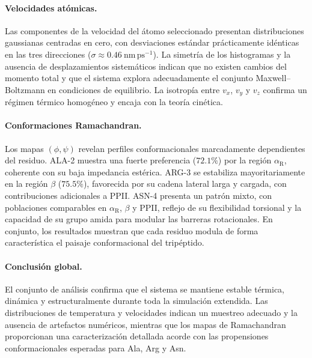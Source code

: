 \documentclass[12pt,a4paper]{article}
\begin{document}
\paragraph{Velocidades atómicas.}
Las componentes de la velocidad del átomo seleccionado presentan distribuciones gaussianas centradas en cero, con desviaciones estándar prácticamente idénticas en las tres direcciones (\(\sigma \approx 0.46~\mathrm{nm\,ps^{-1}}\)). La simetría de los histogramas y la ausencia de desplazamientos sistemáticos indican que no existen cambios del momento total y que el sistema explora adecuadamente el conjunto Maxwell--Boltzmann en condiciones de equilibrio. La isotropía entre \(v_x\), \(v_y\) y \(v_z\) confirma un régimen térmico homogéneo y encaja con la teoría cinética.

\paragraph{Conformaciones Ramachandran.}
Los mapas \((\phi,\psi)\) revelan perfiles conformacionales marcadamente dependientes del residuo. ALA-2 muestra una fuerte preferencia (\(72.1\%\)) por la región \(\alpha_{\mathrm{R}}\), coherente con su baja impedancia estérica. ARG-3 se estabiliza mayoritariamente en la región \(\beta\) (\(75.5\%\)), favorecida por su cadena lateral larga y cargada, con contribuciones adicionales a PPII. ASN-4 presenta un patrón mixto, con poblaciones comparables en \(\alpha_{\mathrm{R}}\), \(\beta\) y PPII, reflejo de su flexibilidad torsional y la capacidad de su grupo amida para modular las barreras rotacionales. En conjunto, los resultados muestran que cada residuo modula de forma característica el paisaje conformacional del tripéptido.

\paragraph{Conclusión global.}
El conjunto de análisis confirma que el sistema se mantiene estable térmica, dinámica y estructuralmente durante toda la simulación extendida. Las distribuciones de temperatura y velocidades indican un muestreo adecuado y la ausencia de artefactos numéricos, mientras que los mapas de Ramachandran proporcionan una caracterización detallada acorde con las propensiones conformacionales esperadas para Ala, Arg y Asn.
\end{document}
